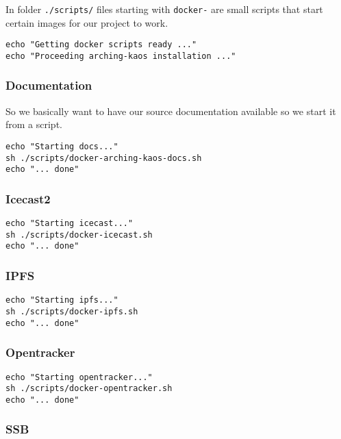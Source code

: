 \documentclass[12pt]{report}
\begin{document}
In folder \texttt{./scripts/} files starting with \texttt{docker-} are
small scripts that start certain images for our project to work.

\begin{verbatim}
echo "Getting docker scripts ready ..."
echo "Proceeding arching-kaos installation ..."
\end{verbatim}


\subsubsection{Documentation}\label{documentation}

So we basically want to have our source documentation available so we
start it from a script.

\begin{verbatim}
echo "Starting docs..."
sh ./scripts/docker-arching-kaos-docs.sh
echo "... done"
\end{verbatim}


\subsubsection{Icecast2}\label{icecast2-1}

\begin{verbatim}
echo "Starting icecast..."
sh ./scripts/docker-icecast.sh
echo "... done"
\end{verbatim}


\subsubsection{IPFS}\label{ipfs}

\begin{verbatim}
echo "Starting ipfs..."
sh ./scripts/docker-ipfs.sh
echo "... done"
\end{verbatim}


\subsubsection{Opentracker}\label{opentracker}

\begin{verbatim}
echo "Starting opentracker..."
sh ./scripts/docker-opentracker.sh
echo "... done"
\end{verbatim}


\subsubsection{SSB}\label{ssb}
\end{document}
